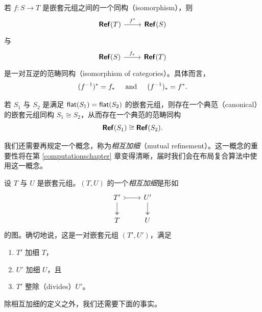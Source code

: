 \begin{observation}
    若 $f:S \to T$ 是嵌套元组之间的一个同构（isomorphism），则
    \[\begin{tikzcd}
        \catstyle{Ref}(T) \ar[r,"f^*"] & \catstyle{Ref}(S)
    \end{tikzcd}
    \]
    与
    \[\begin{tikzcd}
        \catstyle{Ref}(S) \ar[r,"f_*"] & \catstyle{Ref}(T)
    \end{tikzcd}
    \]
    是一对互逆的范畴同构（isomorphism of categories）。具体而言，
    \[
    (f^{-1})^* = f_* \hspace{0.2in} \text{and} \hspace{0.2in} (f^{-1})_* = f^*.
    \]
\end{observation}

\begin{observation}
    若 $S_1$ 与 $S_2$ 是满足 $\mathsf{flat}(S_1) = \mathsf{flat}(S_2)$ 的嵌套元组，则存在一个典范（canonical）的嵌套元组同构 $S_1 \cong S_2$，从而存在一个典范的范畴同构
    \[
    {\boldsymbol{\mathsf{Ref}}}(S_1) \cong {\boldsymbol{\mathsf{Ref}}}(S_2).
    \]
\end{observation}

我们还需要再规定一个概念，称为{\it 相互加细}（mutual refinement）。这一概念的重要性将在第 \ref{computationschapter} 章变得清晰，届时我们会在布局复合算法中使用这一概念。

\begin{definition}
设 $T$ 与 $U$ 是嵌套元组。$(T,U)$ 的一个{\it 相互加细}是形如
\[ \begin{tikzcd} 
T' \ar[r,rightarrowtail] \ar[d, two heads] & U' \ar[d,two heads] \\
T & U
\end{tikzcd} \]
的图。确切地说，这是一对嵌套元组 $(T',U')$，满足\begin{enumerate}
    \item $T'$ 加细 $T$，
    \item $U'$ 加细 $U$，且
    \item $T'$ 整除（divides）$U'$。 
\end{enumerate}
\end{definition}

除相互加细的定义之外，我们还需要下面的事实。

